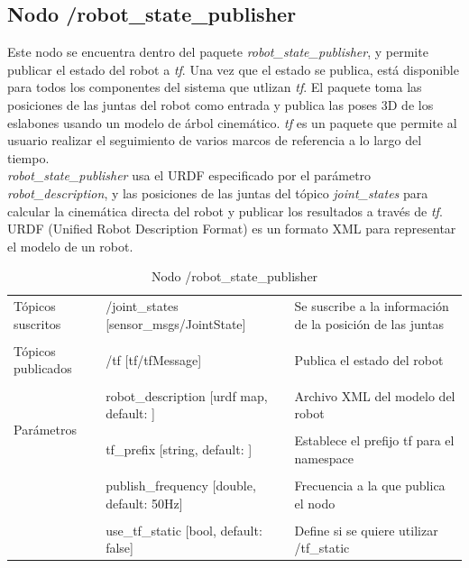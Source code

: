 \documentclass[a4paper,usenames,dvipsnames,svgnames,table]{book}
\begin{document}
\subsection{Nodo /robot\_state\_publisher}
Este nodo se encuentra dentro del paquete \textit{robot\_state\_publisher}, y permite publicar el estado del robot a \textit{tf}. Una vez que el estado se publica, está disponible para todos los componentes del sistema que utlizan \textit{tf}. El paquete toma las posiciones de las juntas del robot como entrada y publica las poses 3D de los eslabones usando un modelo de árbol cinemático. \textit{tf} es un paquete que permite al usuario realizar el seguimiento de varios marcos de referencia a lo largo del tiempo.\\

\textit{robot\_state\_publisher} usa el URDF especificado por el parámetro \textit{robot\_description}, y las posiciones de las juntas del tópico \textit{joint\_states} para calcular la cinemática directa del robot y publicar los resultados a través de \textit{tf}. URDF (Unified Robot Description Format) es un formato  XML para representar el modelo de un robot.

\begin{table}[H]
\begin{center}
\begin{tabular}{|l|l|p{4cm}|}%
\hline

Tópicos suscritos &  /joint\_states [sensor\_msgs/JointState] & Se suscribe a la información de la posición de las juntas \\ 
& & \\
\hline

Tópicos publicados &  /tf [tf/tfMessage] & Publica el estado del robot \\
& & \\
\hline

\multirow{4}{*}{Parámetros} 
&  robot\_description [urdf map, default: ] & Archivo XML del modelo del robot \\
& & \\
& tf\_prefix [string, default: ]  & Establece el prefijo tf para el namespace\\
& & \\
& publish\_frequency [double, default: 50Hz] & Frecuencia a la que publica el nodo\\
& & \\
& use\_tf\_static [bool, default: false]  & Define si se quiere utilizar /tf\_static\\
\cline{1-3}

\end{tabular}
\caption{Nodo /robot\_state\_publisher}
\label{robot state publisher node}
\end{center}
\end{table}
\end{document}
